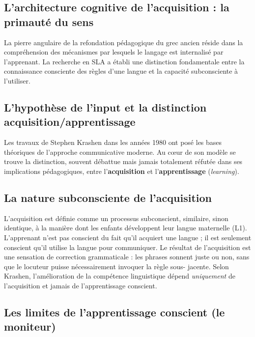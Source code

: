 \subsection{L'architecture cognitive de l'acquisition : la primauté du sens}

La pierre angulaire de la refondation pédagogique du grec ancien réside dans la compréhension des
mécanismes par lesquels le langage est internalisé par l'apprenant. La recherche en SLA a établi une
distinction fondamentale entre la connaissance consciente des règles d'une langue et la capacité
subconsciente à l'utiliser.



\subsection{L'hypothèse de l'input et la distinction acquisition/apprentissage}

Les travaux de Stephen Krashen dans les années 1980 ont posé les bases théoriques de l'approche
communicative moderne. Au cœur de son modèle se trouve la distinction, souvent débattue mais jamais
totalement réfutée dans ses implications pédagogiques, entre l'\textbf{acquisition} et
l'\textbf{apprentissage} (\textit{learning}).



\subsection{La nature subconsciente de l'acquisition}

L'acquisition est définie comme un processus subconscient, similaire, sinon identique, à la manière
dont les enfants développent leur langue maternelle (L1). L'apprenant n'est pas conscient du fait
qu'il acquiert une langue ; il est seulement conscient qu'il utilise la langue pour communiquer. Le
résultat de l'acquisition est une \og sensation\fg{} de correction grammaticale : les phrases \og
sonnent juste\fg{} ou non, sans que le locuteur puisse nécessairement invoquer la règle sous-
jacente.\cite{II-3-3-ref1} Selon Krashen, l'amélioration de la compétence linguistique dépend
\textit{uniquement} de l'acquisition et jamais de l'apprentissage conscient.\cite{II-3-3-ref3}



\subsection{Les limites de l'apprentissage conscient (le moniteur)}


